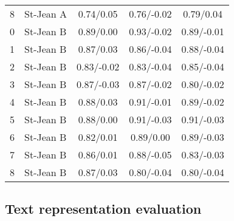 \begin{table}
\begin{tabular}{l l c c c}
    8 & St-Jean A & 0.74/0.05 &  0.76/-0.02 & 0.79/0.04 \\
    0 & St-Jean B & 0.89/0.00 &  0.93/-0.02 &  0.89/-0.01 \\
    1 & St-Jean B & 0.87/0.03 &  0.86/-0.04 &  0.88/-0.04 \\
    2 & St-Jean B &  0.83/-0.02 &  0.83/-0.04 &  0.85/-0.04 \\
    3 & St-Jean B &  0.87/-0.03 &  0.87/-0.02 &  0.80/-0.02 \\
    4 & St-Jean B & 0.88/0.03 &  0.91/-0.01 &  0.89/-0.02 \\
    5 & St-Jean B & 0.88/0.00 &  0.91/-0.03 &  0.91/-0.03 \\
    6 & St-Jean B & 0.82/0.01 & 0.89/0.00 &  0.89/-0.03 \\
    7 & St-Jean B & 0.86/0.01 &  0.88/-0.05 &  0.83/-0.03 \\
    8 & St-Jean B & 0.87/0.03 &  0.80/-0.04 &  0.80/-0.04 \\
    \bottomrule
  \end{tabular}
\end{table}


\newpage
\subsection{Text representation evaluation \label{sec:annex_retained_text_representation}}

